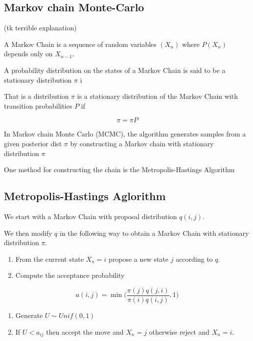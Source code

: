 \documentclass[]{article}
\providecommand{\tightlist}{%
  \setlength{\itemsep}{0pt}\setlength{\parskip}{0pt}}
\numberwithin{equation}{section}
\begin{document}
\hypertarget{markov-chain-monte-carlo}{%
\subsection{Markov chain Monte-Carlo}\label{markov-chain-monte-carlo}}

(tk terrible explanation)

A Markov Chain is a sequence of random variables \((X_n)\) where
\(P(X_n)\) depends only on \(X_{n-1}\).

A probability distribution on the states of a Markov Chain is said to be
a stationary distribution \(\pi\) i

That is a distribution \(\pi\) is a stationary distribution of the
Markov Chain with transition probabilities \(P\) if

\[ \pi = \pi P \]

In Markov chain Monte Carlo (MCMC), the algorithm generates samples from
a given posterior dist \(\pi\) by constructing a Markov chain with
stationary distribution \(\pi\)

One method for constructing the chain is the Metropolis-Hastings
Algorithm

\hypertarget{metropolis-hastings-aglorithm}{%
\subsection{Metropolis-Hastings
Aglorithm}\label{metropolis-hastings-aglorithm}}

We start with a Markov Chain with proposal distribution \(q(i,j)\).

We then modify \(q\) in the following way to obtain a Markov Chain with
stationary distribution \(\pi\).

\begin{enumerate}
\def\labelenumi{\arabic{enumi}.}
\tightlist
\item
  From the current state \(X_n = i\) propose a new state \(j\) according
  to \(q\).
\item
  Compute the acceptance probability
\end{enumerate}

\[a(i,j) = \min{\big(\frac{\pi(j)q(j,i)}{\pi(i)q(i,j)},1\big) }\]

\begin{enumerate}
\def\labelenumi{\arabic{enumi}.}
\setcounter{enumi}{2}
\tightlist
\item
  Generate \(U \sim Unif(0,1)\)
\item
  If \(U < a_{ij}\) then accept the move and \(X_n = j\) otherwise
  reject and \(X_n = i\).
\end{enumerate}
\end{document}
